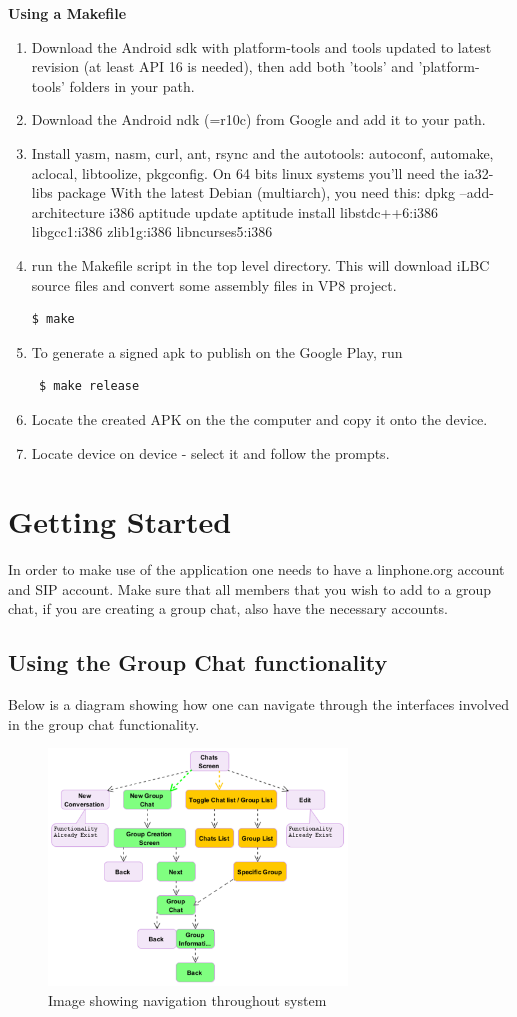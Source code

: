 \documentclass[11pt]{article}
\begin{document}
\textbf{Using a Makefile}
\begin{enumerate}
\item Download the Android sdk with platform-tools and tools updated to latest revision (at least API 16 is needed), then add both 'tools' and 'platform-tools' folders in your path.
\item Download the Android ndk (=r10c) from Google and add it to your path.
\item Install yasm, nasm, curl, ant, rsync and the autotools: autoconf, automake, aclocal, libtoolize, pkgconfig.
\subitem On 64 bits linux systems you'll need the ia32-libs package
\subitem With the latest Debian (multiarch), you need this:
\subsubitem dpkg --add-architecture i386
\subsubitem aptitude update
\subsubitem aptitude install libstdc++6:i386 libgcc1:i386 zlib1g:i386 libncurses5:i386
\item run the Makefile script in the top level directory. This will download iLBC source files and convert some assembly files in VP8 project.
\begin{verbatim}$ make \end{verbatim}
\item To generate a signed apk to publish on the Google Play, run  \begin{verbatim} $ make release \end{verbatim}
\item Locate the created APK on the the computer and copy it onto the device. 
\item Locate device on device - select it and follow the prompts.
\end{enumerate}

\section{Getting Started}
In order to make use of the application one needs to have a linphone.org account and SIP account. Make sure that all members that you wish to add to a group chat, if you are creating a group chat, also have the necessary accounts.
\subsection{Using the Group Chat functionality}
Below is a diagram showing how one can navigate through the interfaces involved in the group chat functionality.
\begin{figure}[H]
\includegraphics[width=300px]{./images/flow.png}
 \caption{Image showing navigation throughout system}
 \label{flow}
 \end{figure}
\end{document}
